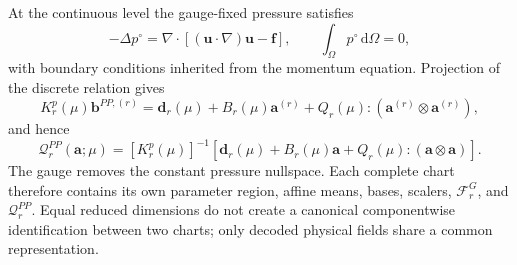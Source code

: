 At the continuous level the gauge-fixed pressure satisfies
\begin{equation}
 -\Delta p^\circ=\nabla\!\cdot\!\left[(\bm u\!\cdot\!\nabla)\bm u-\bm f\right],
 \qquad \int_\Omega p^\circ\,\mathrm d\Omega=0,
\end{equation}
with boundary conditions inherited from the momentum equation. Projection of the discrete relation gives
\begin{equation}
 K_r^p(\mu)\bm b^{PP,(r)}=\bm d_r(\mu)+B_r(\mu)\bm a^{(r)}
 +Q_r(\mu):(\bm a^{(r)}\otimes\bm a^{(r)}),
 \label{eq:app_pressure_poisson_system}
\end{equation}
and hence
\begin{equation}
 \mathcal Q_r^{PP}(\bm a;\mu)=[K_r^p(\mu)]^{-1}
 \left[\bm d_r(\mu)+B_r(\mu)\bm a+Q_r(\mu):(\bm a\otimes\bm a)\right].
 \label{eq:app_pressure_poisson_map}
\end{equation}
The gauge removes the constant pressure nullspace. Each complete chart therefore contains its own parameter region, affine means, bases, scalers, $\mathcal F_r^G$, and $\mathcal Q_r^{PP}$. Equal reduced dimensions do not create a canonical componentwise identification between two charts; only decoded physical fields share a common representation.
